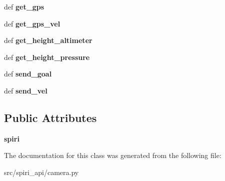 \begin{DoxyCompactItemize}
\item 
\hypertarget{classspiri__api_1_1camera_1_1spiri__api__python_ab76820aafb40309b24303d6d40f49a52}{def {\bfseries get\-\_\-gps}}\label{classspiri__api_1_1camera_1_1spiri__api__python_ab76820aafb40309b24303d6d40f49a52}

\item 
\hypertarget{classspiri__api_1_1camera_1_1spiri__api__python_a2d8a9392961842e96452bfba555ddd54}{def {\bfseries get\-\_\-gps\-\_\-vel}}\label{classspiri__api_1_1camera_1_1spiri__api__python_a2d8a9392961842e96452bfba555ddd54}

\item 
\hypertarget{classspiri__api_1_1camera_1_1spiri__api__python_a49498a715c2022dba9bdb6af0cb3e3b9}{def {\bfseries get\-\_\-height\-\_\-altimeter}}\label{classspiri__api_1_1camera_1_1spiri__api__python_a49498a715c2022dba9bdb6af0cb3e3b9}

\item 
\hypertarget{classspiri__api_1_1camera_1_1spiri__api__python_af13525eaee4131453a8755e57f7f5836}{def {\bfseries get\-\_\-height\-\_\-pressure}}\label{classspiri__api_1_1camera_1_1spiri__api__python_af13525eaee4131453a8755e57f7f5836}

\item 
\hypertarget{classspiri__api_1_1camera_1_1spiri__api__python_a340cd54286e933808a6f197265d68e51}{def {\bfseries send\-\_\-goal}}\label{classspiri__api_1_1camera_1_1spiri__api__python_a340cd54286e933808a6f197265d68e51}

\item 
\hypertarget{classspiri__api_1_1camera_1_1spiri__api__python_a39cd2f24dfdce8d625f180520eb79aa5}{def {\bfseries send\-\_\-vel}}\label{classspiri__api_1_1camera_1_1spiri__api__python_a39cd2f24dfdce8d625f180520eb79aa5}

\end{DoxyCompactItemize}
\subsection*{\-Public \-Attributes}
\begin{DoxyCompactItemize}
\item 
\hypertarget{classspiri__api_1_1camera_1_1spiri__api__python_aa75408dd4a535871cc9c9278119bef8e}{{\bfseries spiri}}\label{classspiri__api_1_1camera_1_1spiri__api__python_aa75408dd4a535871cc9c9278119bef8e}

\end{DoxyCompactItemize}


\-The documentation for this class was generated from the following file\-:\begin{DoxyCompactItemize}
\item 
src/spiri\-\_\-api/camera.\-py\end{DoxyCompactItemize}
